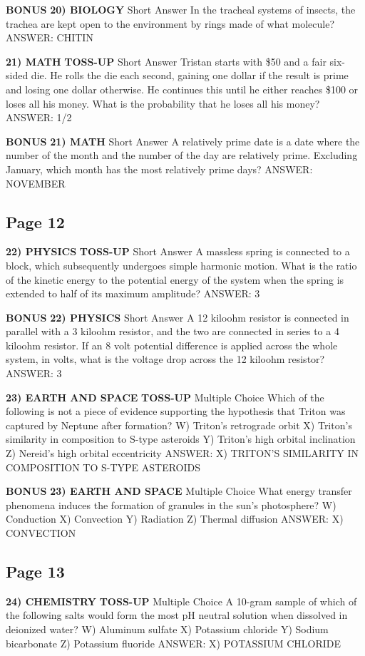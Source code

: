 \documentclass{article}
\begin{document}
\textbf{BONUS}
\textbf{20) BIOLOGY}
Short Answer In the tracheal systems of insects, the trachea are kept open to the environment by rings made of what molecule?
ANSWER: CHITIN

\textbf{21) MATH}
\textbf{TOSS-UP}
Short Answer Tristan starts with \$50 and a fair six-sided die. He rolls the die each second, gaining one dollar if the result is prime and losing one dollar otherwise. He continues this until he either reaches \$100 or loses all his money. What is the probability that he loses all his money?
ANSWER: 1/2

\textbf{BONUS}
\textbf{21) MATH}
Short Answer A relatively prime date is a date where the number of the month and the number of the day are relatively prime. Excluding January, which month has the most relatively prime days?
ANSWER: NOVEMBER

\subsection*{Page 12}
\textbf{22) PHYSICS}
\textbf{TOSS-UP}
Short Answer A massless spring is connected to a block, which subsequently undergoes simple harmonic motion. What is the ratio of the kinetic energy to the potential energy of the system when the spring is extended to half of its maximum amplitude?
ANSWER: 3

\textbf{BONUS}
\textbf{22) PHYSICS}
Short Answer A 12 kiloohm resistor is connected in parallel with a 3 kiloohm resistor, and the two are connected in series to a 4 kiloohm resistor. If an 8 volt potential difference is applied across the whole system, in volts, what is the voltage drop across the 12 kiloohm resistor?
ANSWER: 3

\textbf{23) EARTH AND SPACE}
\textbf{TOSS-UP}
Multiple Choice Which of the following is not a piece of evidence supporting the hypothesis that Triton was captured by Neptune after formation?
W) Triton's retrograde orbit
X) Triton's similarity in composition to S-type asteroids
Y) Triton's high orbital inclination
Z) Nereid's high orbital eccentricity
ANSWER: X) TRITON'S SIMILARITY IN COMPOSITION TO S-TYPE ASTEROIDS

\textbf{BONUS}
\textbf{23) EARTH AND SPACE}
Multiple Choice What energy transfer phenomena induces the formation of granules in the sun's photosphere?
W) Conduction
X) Convection
Y) Radiation
Z) Thermal diffusion
ANSWER: X) CONVECTION

\subsection*{Page 13}
\textbf{24) CHEMISTRY}
\textbf{TOSS-UP}
Multiple Choice A 10-gram sample of which of the following salts would form the most pH neutral solution when dissolved in deionized water?
W) Aluminum sulfate
X) Potassium chloride
Y) Sodium bicarbonate
Z) Potassium fluoride
ANSWER: X) POTASSIUM CHLORIDE
\end{document}
